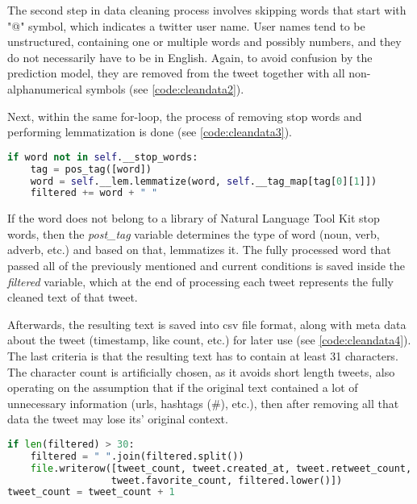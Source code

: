             The second step in data cleaning process involves skipping words that start with "@" symbol, which indicates a twitter user name. User names tend to be unstructured, containing one or multiple words and possibly numbers, and they do not necessarily have to be in English. Again, to avoid confusion by the prediction model, they are removed from the tweet together with all non-alphanumerical symbols (see \cref{code:cleandata2}).
            
            Next, within the same for-loop, the process of removing stop words and performing lemmatization is done (see \cref{code:cleandata3}).
            
            \begin{lstlisting}[language=Python, caption=Cleaning of Data (Part 3), label=code:cleandata3]
if word not in self.__stop_words:
    tag = pos_tag([word])
    word = self.__lem.lemmatize(word, self.__tag_map[tag[0][1]])
    filtered += word + " "
            \end{lstlisting}
            
            If the word does not belong to a library of Natural Language Tool Kit stop words, then the \textit{post\_tag} variable determines the type of word (noun, verb, adverb, etc.) and based on that, lemmatizes it. The fully processed word that passed all of the previously mentioned and current conditions is saved inside the \textit{filtered} variable, which at the end of processing each tweet represents the fully cleaned text of that tweet.
            
            Afterwards, the resulting text is saved into \gls{csv} file format, along with meta data about the tweet (timestamp, like count, etc.) for later use (see \cref{code:cleandata4}). The last criteria is that the resulting text has to contain at least 31 characters. The character count is artificially chosen, as it avoids short length tweets, also operating on the assumption that if the original text contained a lot of unnecessary information (\gls{url}s, hashtags (\#), etc.), then after removing all that data the tweet may lose its' original context. 
            
            \begin{lstlisting}[language=Python, caption=Cleaning of Data (Part 4), label=code:cleandata4]
if len(filtered) > 30:
    filtered = " ".join(filtered.split())
    file.writerow([tweet_count, tweet.created_at, tweet.retweet_count,
                  tweet.favorite_count, filtered.lower()])
tweet_count = tweet_count + 1
            \end{lstlisting}
            
